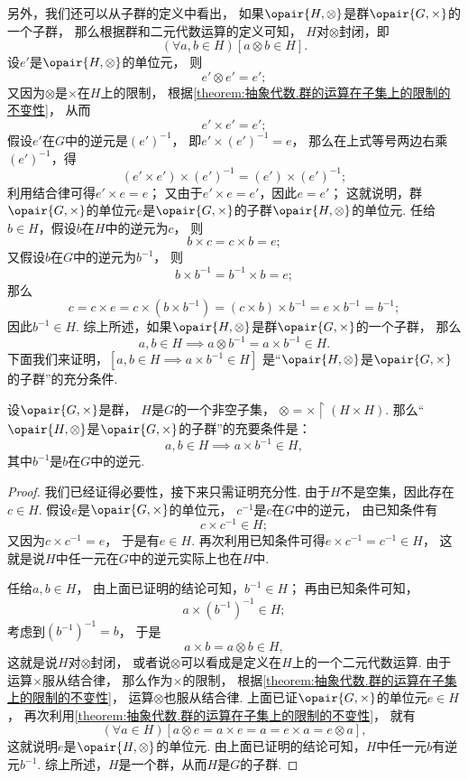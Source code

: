 另外，我们还可以从子群的定义中看出，
如果\(\opair{H,\otimes}\)是群\(\opair{G,\times}\)的一个子群，
那么根据群和二元代数运算的定义可知，
\(H\)对\(\otimes\)封闭，即
\[
	(\forall a,b \in H)[a \otimes b \in H].
\]
设\(e'\)是\(\opair{H,\otimes}\)的单位元，
则\[
	e' \otimes e' = e';
\]
又因为\(\otimes\)是\(\times\)在\(H\)上的限制，
根据\cref{theorem:抽象代数.群的运算在子集上的限制的不变性}，
从而\[
	e' \times e' = e';
\]
假设\(e'\)在\(G\)中的逆元是\((e')^{-1}\)，
即\(e' \times (e')^{-1} = e\)，
那么在上式等号两边右乘\((e')^{-1}\)，得\[
	(e' \times e') \times (e')^{-1} = (e') \times (e')^{-1};
\]
利用结合律可得\(e' \times e = e\)；
又由于\(e' \times e = e'\)，因此\(e = e'\)；
这就说明，群\(\opair{G,\times}\)的单位元\(e\)是\(\opair{G,\times}\)的子群\(\opair{H,\otimes}\)的单位元.
任给\(b \in H\)，假设\(b\)在\(H\)中的逆元为\(c\)，
则\[
	b \times c = c \times b = e;
\]
又假设\(b\)在\(G\)中的逆元为\(b^{-1}\)，
则\[
	b \times b^{-1} = b^{-1} \times b = e;
\]
那么\[
	c = c \times e
	= c \times (b \times b^{-1})
	= (c \times b) \times b^{-1}
	= e \times b^{-1}
	= b^{-1};
\]
因此\(b^{-1} \in H\).
综上所述，如果\(\opair{H,\otimes}\)是群\(\opair{G,\times}\)的一个子群，
那么\[
	a,b \in H \implies a \otimes b^{-1} = a \times b^{-1} \in H.
\]
下面我们来证明，\([a,b \in H \implies a \times b^{-1} \in H]\)
是“\(\opair{H,\otimes}\)是\(\opair{G,\times}\)的子群”的充分条件.
\begin{theorem}
设\(\opair{G,\times}\)是群，
\(H\)是\(G\)的一个非空子集，
\(\otimes = \times \upharpoonright(H \times H)\).
那么“\(\opair{H,\otimes}\)是\(\opair{G,\times}\)的子群”的充要条件是：\[
	a,b \in H \implies a \times b^{-1} \in H,
\]
其中\(b^{-1}\)是\(b\)在\(G\)中的逆元.
\begin{proof}
我们已经证得必要性，接下来只需证明充分性.
由于\(H\)不是空集，因此存在\(c \in H\).
假设\(e\)是\(\opair{G,\times}\)的单位元，
\(c^{-1}\)是\(c\)在\(G\)中的逆元，
由已知条件有\[
	c \times c^{-1} \in H;
\]
又因为\(c \times c^{-1} = e\)，
于是有\(e \in H\).
再次利用已知条件可得\(e \times c^{-1} = c^{-1} \in H\)，
这就是说\(H\)中任一元在\(G\)中的逆元实际上也在\(H\)中.

任给\(a,b \in H\)，
由上面已证明的结论可知，\(b^{-1} \in H\)；
再由已知条件可知，\[
	a \times (b^{-1})^{-1} \in H;
\]
考虑到\((b^{-1})^{-1} = b\)，
于是\[
	a \times b = a \otimes b \in H,
\]
这就是说\(H\)对\(\otimes\)封闭，
或者说\(\otimes\)可以看成是定义在\(H\)上的一个二元代数运算.
由于运算\(\times\)服从结合律，
那么作为\(\times\)的限制，
根据\cref{theorem:抽象代数.群的运算在子集上的限制的不变性}，
运算\(\otimes\)也服从结合律.
上面已证\(\opair{G,\times}\)的单位元\(e \in H\)，
再次利用\cref{theorem:抽象代数.群的运算在子集上的限制的不变性}，
就有\[
	(\forall a \in H)[
		a \otimes e = a \times e = a = e \times a = e \otimes a
	],
\]
这就说明\(e\)是\(\opair{H,\otimes}\)的单位元.
由上面已证明的结论可知，\(H\)中任一元\(b\)有逆元\(b^{-1}\).
综上所述，\(H\)是一个群，从而\(H\)是\(G\)的子群.
\end{proof}
\end{theorem}

